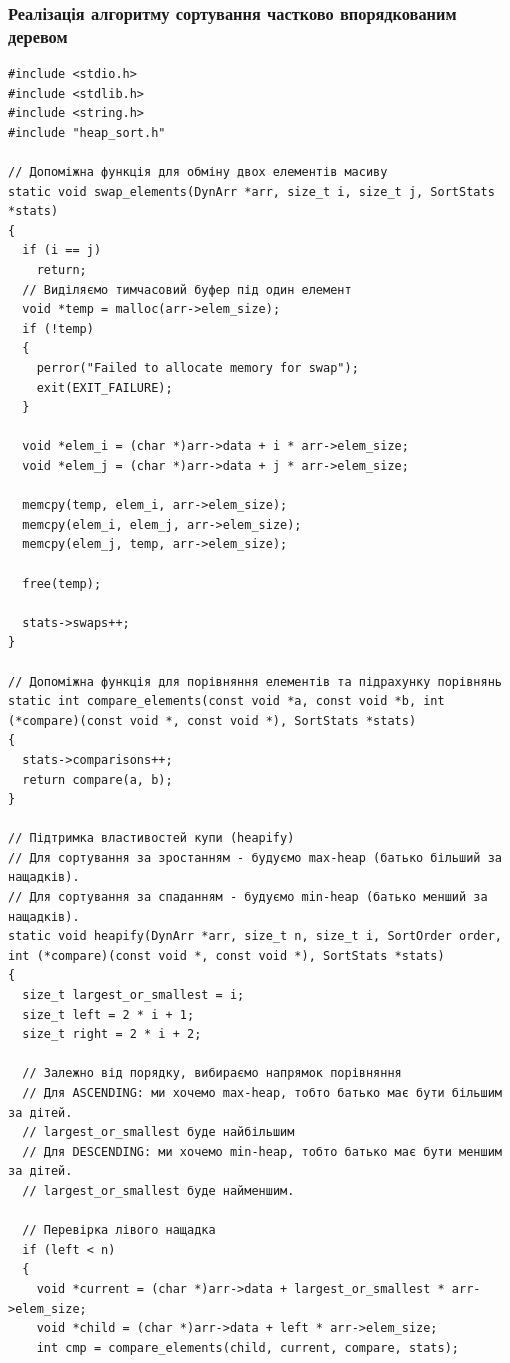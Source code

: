 \clearpage
\subsubsection{Реалізація алгоритму сортування частково впорядкованим деревом}
\begin{lstlisting}[style=customc]
#include <stdio.h>
#include <stdlib.h>
#include <string.h>
#include "heap_sort.h"

// Допоміжна функція для обміну двох елементів масиву
static void swap_elements(DynArr *arr, size_t i, size_t j, SortStats *stats)
{
  if (i == j)
    return;
  // Виділяємо тимчасовий буфер під один елемент
  void *temp = malloc(arr->elem_size);
  if (!temp)
  {
    perror("Failed to allocate memory for swap");
    exit(EXIT_FAILURE);
  }

  void *elem_i = (char *)arr->data + i * arr->elem_size;
  void *elem_j = (char *)arr->data + j * arr->elem_size;

  memcpy(temp, elem_i, arr->elem_size);
  memcpy(elem_i, elem_j, arr->elem_size);
  memcpy(elem_j, temp, arr->elem_size);

  free(temp);

  stats->swaps++;
}

// Допоміжна функція для порівняння елементів та підрахунку порівнянь
static int compare_elements(const void *a, const void *b, int (*compare)(const void *, const void *), SortStats *stats)
{
  stats->comparisons++;
  return compare(a, b);
}

// Підтримка властивостей купи (heapify)
// Для сортування за зростанням - будуємо max-heap (батько більший за нащадків).
// Для сортування за спаданням - будуємо min-heap (батько менший за нащадків).
static void heapify(DynArr *arr, size_t n, size_t i, SortOrder order, int (*compare)(const void *, const void *), SortStats *stats)
{
  size_t largest_or_smallest = i;
  size_t left = 2 * i + 1;
  size_t right = 2 * i + 2;

  // Залежно від порядку, вибираємо напрямок порівняння
  // Для ASCENDING: ми хочемо max-heap, тобто батько має бути більшим за дітей.
  // largest_or_smallest буде найбільшим
  // Для DESCENDING: ми хочемо min-heap, тобто батько має бути меншим за дітей.
  // largest_or_smallest буде найменшим.

  // Перевірка лівого нащадка
  if (left < n)
  {
    void *current = (char *)arr->data + largest_or_smallest * arr->elem_size;
    void *child = (char *)arr->data + left * arr->elem_size;
    int cmp = compare_elements(child, current, compare, stats);


\end{lstlisting}
